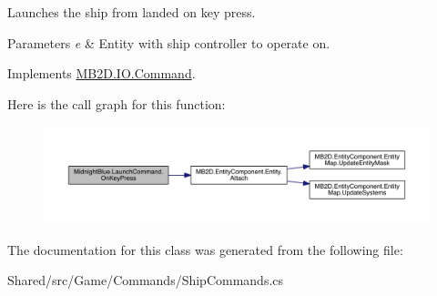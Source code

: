 Launches the ship from landed on key press. 


\begin{DoxyParams}{Parameters}
{\em e} & Entity with ship controller to operate on.\\
\hline
\end{DoxyParams}


Implements \hyperlink{class_m_b2_d_1_1_i_o_1_1_command_ae927e36c0e285848325cc68eddb5fd72}{M\+B2\+D.\+I\+O.\+Command}.

Here is the call graph for this function\+:
\nopagebreak
\begin{figure}[H]
\begin{center}
\leavevmode
\includegraphics[width=350pt]{class_midnight_blue_1_1_launch_command_a5da2fdd898111ea59f4f63126c380a3e_cgraph}
\end{center}
\end{figure}


The documentation for this class was generated from the following file\+:\begin{DoxyCompactItemize}
\item 
Shared/src/\+Game/\+Commands/Ship\+Commands.\+cs\end{DoxyCompactItemize}
